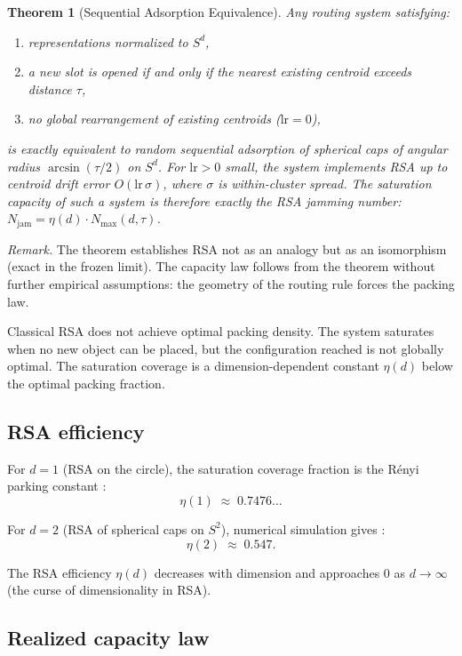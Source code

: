 \documentclass[11pt]{article}
\newtheorem{theorem}{Theorem}
\begin{document}
\begin{theorem}[Sequential Adsorption Equivalence]
\label{thm:rsa_equiv}
Any routing system satisfying:
\begin{enumerate}
  \item representations normalized to $S^d$,
  \item a new slot is opened if and only if the nearest existing centroid exceeds distance $\tau$,
  \item no global rearrangement of existing centroids ($\mathrm{lr} = 0$),
\end{enumerate}
is \emph{exactly} equivalent to random sequential adsorption of spherical caps of angular radius
$\arcsin(\tau/2)$ on $S^d$.
For $\mathrm{lr} > 0$ small, the system implements RSA up to centroid drift error
$O(\mathrm{lr}\,\sigma)$, where $\sigma$ is within-cluster spread.
The saturation capacity of such a system is therefore exactly the RSA jamming number:
$N_{\mathrm{jam}} = \eta(d) \cdot N_{\max}(d,\tau)$.
\end{theorem}

\noindent\textit{Remark.} The theorem establishes RSA not as an analogy but as an isomorphism
(exact in the frozen limit). The capacity law follows from the theorem without further empirical
assumptions: the geometry of the routing rule forces the packing law.

Classical RSA does not achieve optimal packing density.
The system saturates when no new object can be placed, but the
configuration reached is not globally optimal.
The saturation coverage is a dimension-dependent constant $\eta(d)$
below the optimal packing fraction.

\subsection{RSA efficiency}

For $d=1$ (RSA on the circle), the saturation coverage fraction is the
Rényi parking constant \cite{renyi1958}:
\[
  \eta(1) \;\approx\; 0.7476\ldots
\]

For $d=2$ (RSA of spherical caps on $S^2$), numerical simulation gives
\cite{torquato2006}:
\[
  \eta(2) \;\approx\; 0.547.
\]

The RSA efficiency $\eta(d)$ decreases with dimension and approaches 0 as
$d \to \infty$ (the curse of dimensionality in RSA).

\subsection{Realized capacity law}
\end{document}
